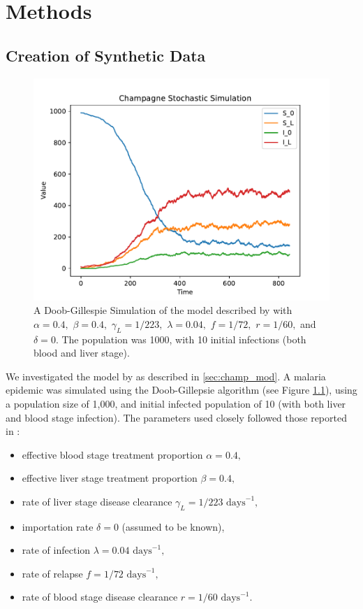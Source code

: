 \chapter{Methods}

\section{Creation of Synthetic Data}

\begin{figure}[htbp]
    \centering
    \includegraphics[width = \textwidth]{../champagne_GP_images/champagne_simulation.pdf}
    \caption{
        A Doob-Gillespie Simulation of the model described by
        \cite{champagne_using_2022} with $\alpha = 0.4,$ $\beta = 0.4,$
        $\gamma_L = 1 / 223,$ $\lambda = 0.04,$ $f = 1 / 72,$ $r = 1 / 60,$ and
        $\delta = 0.$ The population was 1000, with 10 initial infections
        (both blood and liver stage).
    }
    \label{fig:champ_doob}
\end{figure}

We investigated the model by \cite{champagne_using_2022} as described in
\ref{sec:champ_mod}. A malaria epidemic was simulated using the Doob-Gillepsie
algorithm (see Figure \ref{fig:champ_doob}), using a population
size of 1,000, and initial infected population of 10 (with both liver and blood
stage infection). The parameters used closely followed those reported in
\cite{champagne_using_2022}: \begin{itemize}
    \item effective blood stage treatment proportion $\alpha = 0.4,$
    \item effective liver stage treatment proportion $\beta = 0.4,$
    \item rate of liver stage disease clearance
          $\gamma_L = 1 / 223 \text{ days}^{-1},$
    \item importation rate $\delta = 0$ (assumed to be known),
    \item rate of infection $\lambda = 0.04 \text{ days}^{-1},$
    \item rate of relapse $f = 1 / 72 \text{ days}^{-1},$
    \item rate of blood stage disease clearance $r = 1 / 60 \text{ days}^{-1}.$
\end{itemize}

